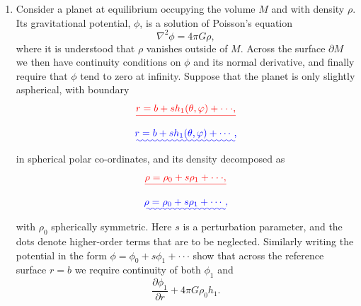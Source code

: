 \documentclass[a4paper,10pt]{paper}
\providecommand{\DIFadd}[1]{{\protect\color{blue}\uwave{#1}}} %
\providecommand{\DIFdel}[1]{{\protect\color{red}\sout{#1}}}                      %
\providecommand{\DIFaddbegin}{} %
\providecommand{\DIFaddend}{} %
\providecommand{\DIFdelbegin}{} %
\providecommand{\DIFdelend}{} %
\begin{document}
\begin{enumerate}
\item Consider a planet at equilibrium occupying the volume $M$ and with density $\rho$. Its gravitational potential, $\phi$, is a solution of Poisson's equation
\begin{equation*}
    \nabla^{2}\phi=4\pi G\rho,
\end{equation*}
where it is understood that $\rho$ vanishes outside of $M$. Across the surface $\partial M$ we then have continuity conditions on $\phi$ and its normal derivative, and finally require that $\phi$ tend to zero at infinity. Suppose that the planet is only slightly aspherical, with boundary
\DIFdelbegin \begin{displaymath}
    \DIFdel{r=b+sh_{1}(\theta,\varphi)+\cdot\cdot\cdot,
}\end{displaymath}%
\DIFdelend \DIFaddbegin \begin{equation*}
    \DIFadd{r=b+sh_{1}(\theta,\varphi)+\cdots,
}\end{equation*}\DIFaddend 
in spherical polar co-ordinates, and its density decomposed as
\DIFdelbegin \begin{displaymath}
    \DIFdel{\rho=\rho_{0}+s \rho_{1}+\cdot\cdot\cdot,
}\end{displaymath}%
\DIFdelend \DIFaddbegin \begin{equation*}
    \DIFadd{\rho=\rho_{0}+s\rho_{1}+\cdots,
}\end{equation*}\DIFaddend 
with $\rho_{0}$ spherically symmetric. Here $s$ is a perturbation parameter, and the dots denote higher-order terms that are to be neglected. Similarly writing the potential in the form \DIFdelbegin \DIFdel{$\phi=\phi_{0}+s \phi_{1}+\cdot\cdot\cdot$ }\DIFdelend \DIFaddbegin \DIFadd{$\phi=\phi_{0}+s\phi_{1}+\cdots$, }\DIFaddend show that across the reference surface $r=b$ we require continuity of both $\phi_{1}$ and
\begin{equation*}
    \frac{\partial\phi_{1}}{\partial r}+4\pi G\rho_{0}h_{1}.
\end{equation*}


\end{enumerate}
\end{document}
